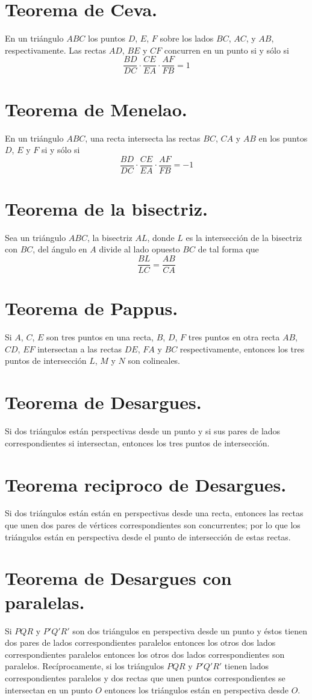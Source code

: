 \documentclass[12pt,a4paper,oneside]{book}
\begin{document}
\section{Teorema de Ceva.}
En un triángulo $ABC$ los puntos $D$, $E$, $F$ sobre los lados $BC$, $AC$, y $AB$, respectivamente. Las rectas $AD$, $BE$ y $CF$ concurren en un punto si y sólo si
$$\dfrac{BD}{DC}\cdot\dfrac{CE}{EA}\cdot\dfrac{AF}{FB}=1$$
\section{Teorema de Menelao.}
En un triángulo $ABC$, una recta intersecta las rectas $BC$, $CA$ y $AB$ en los puntos $D$, $E$ y $F$ si y sólo si
$$\dfrac{BD}{DC}\cdot\dfrac{CE}{EA}\cdot\dfrac{AF}{FB}=-1$$
\section{Teorema de la bisectriz.}
Sea un triángulo $ABC$, la bisectriz $AL$, donde $L$ es la intersección de la bisectriz con $BC$, del ángulo en $A$ divide al lado opuesto $BC$ de tal forma que
$$\dfrac{BL}{LC}=\dfrac{AB}{CA}$$
\section{Teorema de Pappus.}
Si $A$, $C$, $E$ son tres puntos en una recta, $B$, $D$, $F$ tres puntos en otra recta $AB$, $CD$, $EF$ intersectan a las rectas $DE$, $FA$ y $BC$ respectivamente, entonces los tres puntos de intersección $L$, $M$ y $N$ son colineales.
\section{Teorema de Desargues.}
Si dos triángulos están perspectivas desde un punto y si sus pares de lados correspondientes si intersectan, entonces los tres puntos de intersección.
\section{Teorema reciproco de Desargues.}
Si dos triángulos están están en perspectivas desde una recta, entonces las rectas que unen dos pares de vértices correspondientes son concurrentes; por lo que los triángulos están en perspectiva desde el punto de intersección de estas rectas.
\section{Teorema de Desargues con paralelas.}
Si $PQR$ y $P'Q'R'$ son dos triángulos  en perspectiva desde un punto y éstos tienen dos pares de lados correspondientes paralelos entonces los otros dos lados correspondientes paralelos entonces los otros dos lados correspondientes son paralelos. Recíprocamente, si los triángulos $PQR$ y $P'Q'R'$ tienen lados correspondientes paralelos y dos rectas que unen puntos correspondientes se intersectan en un punto $O$ entonces los triángulos están en perspectiva desde $O$.
\end{document}
